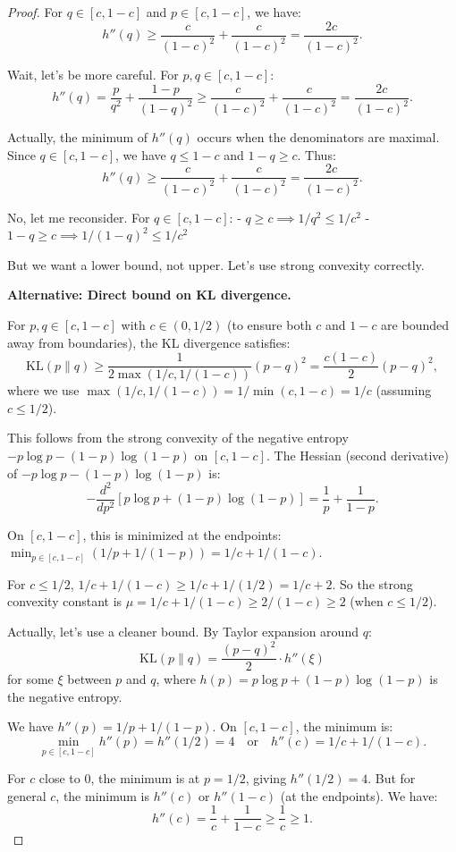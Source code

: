 \begin{proof}
For $q \in [c, 1-c]$ and $p \in [c, 1-c]$, we have:
\[
h''(q) \ge \frac{c}{(1-c)^2} + \frac{c}{(1-c)^2} = \frac{2c}{(1-c)^2}.
\]

Wait, let's be more careful. For $p, q \in [c, 1-c]$:
\[
h''(q) = \frac{p}{q^2} + \frac{1-p}{(1-q)^2} \ge \frac{c}{(1-c)^2} + \frac{c}{(1-c)^2} = \frac{2c}{(1-c)^2}.
\]

Actually, the minimum of $h''(q)$ occurs when the denominators are maximal. Since $q \in [c, 1-c]$, we have $q \le 1-c$ and $1-q \ge c$. Thus:
\[
h''(q) \ge \frac{c}{(1-c)^2} + \frac{c}{(1-c)^2} = \frac{2c}{(1-c)^2}.
\]

No, let me reconsider. For $q \in [c, 1-c]$:
- $q \ge c \implies 1/q^2 \le 1/c^2$
- $1-q \ge c \implies 1/(1-q)^2 \le 1/c^2$

But we want a lower bound, not upper. Let's use strong convexity correctly.

\textbf{Alternative: Direct bound on KL divergence.}

For $p, q \in [c, 1-c]$ with $c \in (0, 1/2)$ (to ensure both $c$ and $1-c$ are bounded away from boundaries), the KL divergence satisfies:
\[
\text{KL}(p \| q) \ge \frac{1}{2 \max(1/c, 1/(1-c))} (p - q)^2 = \frac{c(1-c)}{2} (p - q)^2,
\]
where we use $\max(1/c, 1/(1-c)) = 1/\min(c, 1-c) = 1/c$ (assuming $c \le 1/2$).

This follows from the strong convexity of the negative entropy $-p \log p - (1-p) \log(1-p)$ on $[c, 1-c]$. The Hessian (second derivative) of $-p \log p - (1-p) \log(1-p)$ is:
\[
-\frac{d^2}{dp^2}[p \log p + (1-p) \log(1-p)] = \frac{1}{p} + \frac{1}{1-p}.
\]

On $[c, 1-c]$, this is minimized at the endpoints: $\min_{p \in [c,1-c]} (1/p + 1/(1-p)) = 1/c + 1/(1-c)$.

For $c \le 1/2$, $1/c + 1/(1-c) \ge 1/c + 1/(1/2) = 1/c + 2$. So the strong convexity constant is $\mu = 1/c + 1/(1-c) \ge 2/(1-c) \ge 2$ (when $c \le 1/2$).

Actually, let's use a cleaner bound. By Taylor expansion around $q$:
\[
\text{KL}(p \| q) = \frac{(p-q)^2}{2} \cdot h''(\xi)
\]
for some $\xi$ between $p$ and $q$, where $h(p) = p \log p + (1-p) \log(1-p)$ is the negative entropy.

We have $h''(p) = 1/p + 1/(1-p)$. On $[c, 1-c]$, the minimum is:
\[
\min_{p \in [c,1-c]} h''(p) = h''(1/2) = 4 \quad \text{or} \quad h''(c) = 1/c + 1/(1-c).
\]

For $c$ close to 0, the minimum is at $p = 1/2$, giving $h''(1/2) = 4$. But for general $c$, the minimum is $h''(c)$ or $h''(1-c)$ (at the endpoints). We have:
\[
h''(c) = \frac{1}{c} + \frac{1}{1-c} \ge \frac{1}{c} \ge 1.
\]


\end{proof}
